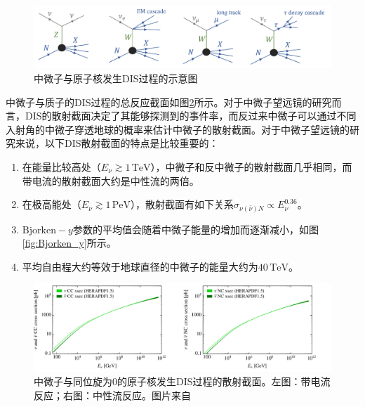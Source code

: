 \begin{figure}[htb]
    \centering
    \includegraphics[width=0.95\linewidth]{img/DIS_types.pdf}
    \caption{中微子与原子核发生DIS过程的示意图}
    \label{fig:DIS_types}
\end{figure}

中微子与质子的DIS过程的总反应截面如图\ref{fig:DIS_cross_section}所示。对于中微子望远镜的研究而言，DIS的散射截面决定了其能够探测到的事件率，而反过来中微子可以通过不同入射角的中微子穿透地球的概率来估计中微子的散射截面\cite{IceCube_cross_section:2020}。对于中微子望远镜的研究来说，以下DIS散射截面的特点是比较重要的：
\begin{enumerate}
    \item 在能量比较高处（$E_\nu \gtrsim 1 \,\mathrm{TeV}$），中微子和反中微子的散射截面几乎相同，而带电流的散射截面大约是中性流的两倍。
    \item 在极高能处（$E_\nu \gtrsim 1 \,\mathrm{PeV}$），散射截面有如下关系$\sigma_{\nu(\bar{\nu})N} \propto E_\nu^{0.36}$。
    \item $\mathrm{Bjorken}-y$参数的平均值会随着中微子能量的增加而逐渐减小，如图\ref{fig:Bjorken_y}所示。
    \item 平均自由程大约等效于地球直径的中微子的能量大约为$40\,\mathrm{TeV}$。
\end{enumerate}

\begin{figure}[htb]
    \centering
    \includegraphics[width=0.95\linewidth]{img/DIS_cross_section.pdf}
    \caption{中微子与同位旋为0的原子核发生DIS过程的散射截面。左图：带电流反应；右图：中性流反应。图片来自\cite{Sarkar_DIS:2011}}
    \label{fig:DIS_cross_section}
\end{figure}

